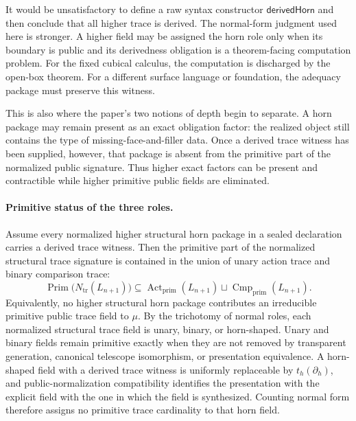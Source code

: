 \documentclass{lmcs}
\begin{document}
\begin{rem}
It would be unsatisfactory to define a raw syntax constructor
\(\mathsf{derivedHorn}\) and then conclude that all higher trace is derived.  The normal-form
judgment used here is stronger.  A higher field may be assigned the horn role only when its
boundary is public and its derivedness obligation is a theorem-facing computation problem.
For the fixed cubical calculus, the computation is discharged by the open-box theorem.  For a
different surface language or foundation, the adequacy package must preserve this witness.
\end{rem}

This is also where the paper's two notions of depth begin to separate.  A horn package may
remain present as an exact obligation factor: the realized object still contains the type of
missing-face-and-filler data.  Once a derived trace witness has been supplied, however,
that package is absent from the primitive part of the normalized public signature.  Thus
higher exact factors can be present and contractible while higher primitive public fields are
eliminated.

\paragraph{Primitive status of the three roles.}
Assume every normalized higher structural horn package in a sealed declaration carries a
derived trace witness.  Then the primitive part of the normalized structural trace
signature is contained in the union of unary action trace and binary comparison trace:
\[
  \operatorname{Prim}\bigl(N_{\mathrm{tr}}(L_{n+1})\bigr)
  \subseteq
  \operatorname{Act}_{\mathrm{prim}}(L_{n+1})
  \sqcup
  \operatorname{Cmp}_{\mathrm{prim}}(L_{n+1}).
\]
Equivalently, no higher structural horn package contributes an irreducible primitive public
trace field to \(\mu\).
By the trichotomy of normal roles, each normalized structural trace field is unary, binary, or
horn-shaped.  Unary and binary fields remain primitive exactly when they are not removed by
transparent generation, canonical telescope isomorphism, or presentation equivalence.  A
horn-shaped field with a derived trace witness is uniformly replaceable by
\(t_h(\partial_h)\), and public-normalization compatibility identifies the presentation with the
explicit field with the one in which the field is synthesized.  Counting normal form therefore
assigns no primitive trace cardinality to that horn field.
\end{document}
